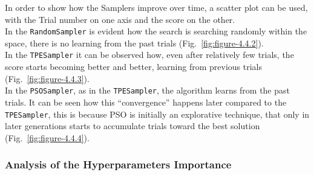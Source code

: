 In order to show how the Samplers improve over time, a scatter plot can be used, with the Trial number on one axis and the score on the other.
\\[0.3cm]In the \texttt{RandomSampler} is evident how the search is searching randomly within the space, there is no learning from the past trials (Fig.~\ref{fig:figure-4.4.2}).
\\[0.3cm]In the \texttt{TPESampler} it can be observed how, even after relatively few trials, the score starts becoming better and better, learning from previous trials (Fig.~\ref{fig:figure-4.4.3}).
\\[0.3cm]In the \texttt{PSOSampler}, as in the \texttt{TPESampler}, the algorithm learns from the past trials. It can be seen how this “convergence” happens later compared to the \texttt{TPESampler}, this is because PSO is initially an explorative technique, that only in later generations starts to accumulate trials toward the best solution (Fig.~\ref{fig:figure-4.4.4}).
% 
% 
% 

\subsubsection{Analysis of the Hyperparameters Importance}

